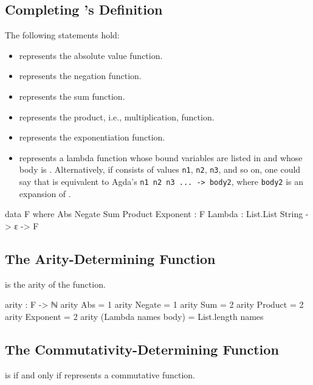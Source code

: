 \documentclass{report}
\begin{document}
\subsection{Completing 's Definition}
The following statements hold:

\begin{itemize}
  \item {} represents the absolute value function.
  \item {} represents the negation function.
  \item {} represents the sum function.
  \item {} represents the product, i.e., multiplication, function.
  \item {} represents the exponentiation function.
  \item {}   represents a lambda function whose bound variables are listed in  and whose body is .  Alternatively, if  consists of values \texttt{n1}, \texttt{n2}, \texttt{n3}, and so on, one could say that    is equivalent to Agda's \texttt{\textasciibackslash n1 n2 n3 ... -> body2}, where \texttt{body2} is an expansion of .
\end{itemize}

\begin{code}
data F where
  Abs
   Negate
   Sum
   Product
   Exponent : F
  Lambda : List.List String -> ε -> F
\end{code}

\subsection{The Arity-Determining Function}
  is the arity of the  function.

\begin{code}
arity : F -> ℕ
arity Abs = 1
arity Negate = 1
arity Sum = 2
arity Product = 2
arity Exponent = 2
arity (Lambda names body) = List.length names
\end{code}

\subsection{The Commutativity-Determining Function}
   is  if and only if  represents a commutative function.
\end{document}
